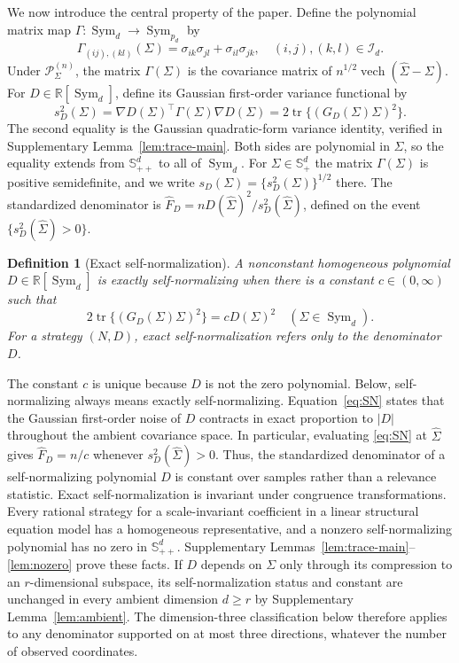 \documentclass[12pt,a4paper]{article}
\theoremstyle{plain}
\newtheorem{definition}{Definition}
\theoremstyle{definition}
\newcommand{\R}{\mathbb{R}}
\newcommand{\Smat}{\mathbb{S}}
\newcommand{\Sym}{\operatorname{Sym}}
\newcommand{\tr}{\operatorname{tr}}
\newcommand{\vech}{\operatorname{vech}}
\newcommand{\Sighat}{\hat{\Sigma}}
\newcommand{\FD}{\widehat{F}_D}
\begin{document}
We now introduce the central property of the paper.
Define the polynomial matrix map $\Gamma:\Sym_d\to\Sym_{p_d}$ by
\begin{equation}
\label{eq:Gamma-gaussian}
    \Gamma_{(ij),(kl)}(\Sigma)
    =
    \sigma_{ik}\sigma_{jl}+\sigma_{il}\sigma_{jk}
    ,
    \quad
    (i,j),(k,l)\in\mathcal{I}_d
    .
\end{equation}
Under $\mathcal{P}_\Sigma^{(n)}$, the matrix $\Gamma(\Sigma)$ is the covariance matrix of $n^{1/2}\vech(\Sighat-\Sigma)$.
For $D\in\R[\Sym_d]$, define its Gaussian first-order variance functional by
\begin{equation}
\label{eq:sD}
    s_D^2(\Sigma)
    =
    \nabla D(\Sigma)^\top\Gamma(\Sigma)\nabla D(\Sigma)
    =
    2\tr\{(G_D(\Sigma)\Sigma)^2\}
    .
\end{equation}
The second equality is the Gaussian quadratic-form variance identity, verified in Supplementary Lemma~\ref{lem:trace-main}.
Both sides are polynomial in $\Sigma$, so the equality extends from $\Smat^d_{++}$ to all of $\Sym_d$.
For $\Sigma\in\Smat^{d}_+$ the matrix $\Gamma(\Sigma)$ is positive semidefinite, and we write $s_D(\Sigma)=\{s_D^2(\Sigma)\}^{1/2}$ there.
The standardized denominator is $\FD=nD(\Sighat)^2/s_D^2(\Sighat)$, defined on the event $\{s_D^2(\Sighat)>0\}$.

\begin{definition}[Exact self-normalization]
\label{def:self-normalization}
    A nonconstant homogeneous polynomial $D\in\R[\Sym_d]$ is exactly self-normalizing when there is a constant $c\in(0,\infty)$ such that
    \begin{equation}
    \label{eq:SN}
        2\tr\{(G_D(\Sigma)\Sigma)^2\}
        =
        cD(\Sigma)^2
        \quad
        (\Sigma\in\Sym_d)
        .
    \end{equation}
    For a strategy $(N,D)$, exact self-normalization refers only to the denominator $D$.
\end{definition}

The constant $c$ is unique because $D$ is not the zero polynomial.
Below, self-normalizing always means exactly self-normalizing.
Equation~\eqref{eq:SN} states that the Gaussian first-order noise of $D$ contracts in exact proportion to $|D|$ throughout the ambient covariance space.
In particular, evaluating \eqref{eq:SN} at $\Sighat$ gives $\FD=n/c$ whenever $s_D^2(\Sighat)>0$.
Thus, the standardized denominator of a self-normalizing polynomial $D$ is constant over samples rather than a relevance statistic.
Exact self-normalization is invariant under congruence transformations.
Every rational strategy for a scale-invariant coefficient in a linear structural equation model has a homogeneous representative, and a nonzero self-normalizing polynomial has no zero in $\Smat^d_{++}$.
Supplementary Lemmas~\ref{lem:trace-main}--\ref{lem:nozero} prove these facts.
If $D$ depends on $\Sigma$ only through its compression to an $r$-dimensional subspace, its self-normalization status and constant are unchanged in every ambient dimension $d\ge r$ by Supplementary Lemma~\ref{lem:ambient}.
The dimension-three classification below therefore applies to any denominator supported on at most three directions, whatever the number of observed coordinates.
\end{document}
